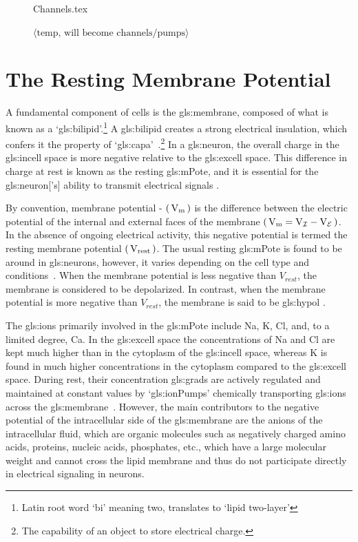 \documentclass[class={myRUCProject}, crop=false]{standalone}
\begin{document}
\begin{figure}[H]
  \centering
  {Channels.tex}
  \caption{ $\langle \text{temp, will become channels/pumps} \rangle$ }\label{fig:Channels}
\end{figure}


\section{The Resting Membrane Potential} 
A fundamental component of cells is the \gls{gls:membrane}, composed of what is known as a `\gls{gls:bilipid}'.{}\footnote{Latin root word `bi' meaning two, translates to `lipid two-layer'} 
A \gls{gls:bilipid} creates a strong electrical insulation, which confers it the property of `\gls{gls:capa}'~\cite{Hammond2015ch3,Hammond2015ch4}.{}\footnote{The capability of an object to store electrical charge.}
In a \gls{gls:neuron}, the overall charge in the \gls{gls:incell} space is more negative relative to the \gls{gls:excell} space. This difference in charge at rest is known as the resting \gls{gls:mPote}, and it is essential for the \gls{gls:neuron}['s] ability to transmit electrical signals \cite{Hammond2015ch3,Hammond2015ch4}. 

By convention, membrane potential - \(\br{\unit{\V\membrane}}\) is the difference between the electric potential of the internal and external faces of the membrane \(\br{\unit{\V\membrane}=\unit{\V\incell}-\unit{\V\excell}}\). In the absence of ongoing electrical activity, this negative potential is termed the resting membrane potential \(\br{\unit{V_{rest}}}\). The usual resting \gls{gls:mPote} is found to be around  in \glspl{gls:neuron}, however, it varies depending on the cell type and conditions~\cite{Hammond2015ch3,Hammond2015ch4}. When the membrane potential is less negative than \(V_{rest}\), the membrane is considered to be depolarized. In contrast, when the membrane potential is more negative than \(V_{rest}\), the membrane is said to be \gls{gls:hypol} \cite{Hammond2015ch3}. 

The \glspl{gls:ion} primarily involved in the \gls{gls:mPote} include \gls{Na}, \gls{K}, \gls{Cl}, and, to a limited degree, \gls{Ca}. 
In the \gls{gls:excell} space the concentrations of \gls{Na} and \gls{Cl} are kept much higher than in the cytoplasm of the \gls{gls:incell} space, whereas \gls{K} is found in much higher concentrations in the cytoplasm compared to the \gls{gls:excell} space. 
During rest, their concentration \glspl{gls:grad} are actively regulated and maintained at constant values by `\glspl{gls:ionPump}' chemically transporting \glspl{gls:ion} across the \gls{gls:membrane}~\cite{Hammond2015ch3,Hammond2015ch4}. 
However, the main contributors to the negative potential of the intracellular side of the \gls{gls:membrane} are the anions of the intracellular fluid, which are organic molecules such as negatively charged amino acids, proteins, nucleic acids, phosphates, etc., which have a large molecular weight and cannot cross the lipid membrane and thus do not participate directly in electrical signaling in neurons\cite{Hammond2015ch3}. 
\end{document}
